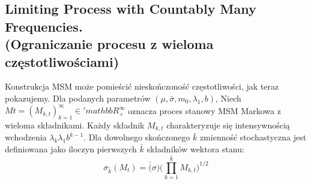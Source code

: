 \documentclass[12pt]{article}
\theoremstyle{definition}
\begin{document}
\subsection{Limiting Process with Countably Many Frequencies.\\(Ograniczanie procesu z wieloma częstotliwościami)}

Konstrukcja MSM może pomieścić nieskończoność częstotliwości, jak teraz pokazujemy. Dla podanych parametrów $(\mu, \bar{\sigma}, m_0, \lambda_1, b)$, Niech $Mt = (M_{k, t})^{\infty}_{k=1} \in 'mathbb{R}^{\infty}_{+}$ oznacza proces stanowy MSM Markowa z wieloma składnikami. Każdy składnik $M_{k, t}$ charakteryzuje się intensywnością wchodzenia $\lambda_k \lambda_1 b^{k-1}$. Dla dowolnego skończonego $\bar{k}$ zmienność stochastyczna jest definiowana jako iloczyn pierwszych $\bar{k}$ składników wektora stanu:
$$\sigma_{\bar{k}}(M_t) = \bar(\sigma)\bigg(\prod_{k=1}^{\bar{k}} M_{k,t} \bigg)^{1/2} $$
\end{document}
